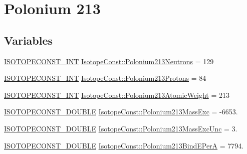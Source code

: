 \hypertarget{group___isotope_const-_polonium-_po213}{}\section{Polonium 213}
\label{group___isotope_const-_polonium-_po213}
\subsection*{Variables}
\begin{DoxyCompactItemize}
\item 
\mbox{\hyperlink{group___isotope_const-_macros_ga5f18360b3e99483a35c32d789e62621c}{I\+S\+O\+T\+O\+P\+E\+C\+O\+N\+S\+T\+\_\+\+I\+NT}} \mbox{\hyperlink{group___isotope_const-_polonium-_po213_gaacfed22d907ccd2d92b8512e03ebe974}{Isotope\+Const\+::\+Polonium213\+Neutrons}} = 129
\item 
\mbox{\hyperlink{group___isotope_const-_macros_ga5f18360b3e99483a35c32d789e62621c}{I\+S\+O\+T\+O\+P\+E\+C\+O\+N\+S\+T\+\_\+\+I\+NT}} \mbox{\hyperlink{group___isotope_const-_polonium-_po213_ga4028fa5f24ff516207ae584aaa287454}{Isotope\+Const\+::\+Polonium213\+Protons}} = 84
\item 
\mbox{\hyperlink{group___isotope_const-_macros_ga5f18360b3e99483a35c32d789e62621c}{I\+S\+O\+T\+O\+P\+E\+C\+O\+N\+S\+T\+\_\+\+I\+NT}} \mbox{\hyperlink{group___isotope_const-_polonium-_po213_ga7eec133bd2674a81f28f175942de5055}{Isotope\+Const\+::\+Polonium213\+Atomic\+Weight}} = 213
\item 
\mbox{\hyperlink{group___isotope_const-_macros_ga8f45a7272ce02c0b4c65c44636ed719a}{I\+S\+O\+T\+O\+P\+E\+C\+O\+N\+S\+T\+\_\+\+D\+O\+U\+B\+LE}} \mbox{\hyperlink{group___isotope_const-_polonium-_po213_gac4c8c9083640bd9eb436e688c36599cd}{Isotope\+Const\+::\+Polonium213\+Mass\+Exc}} = -\/6653.
\item 
\mbox{\hyperlink{group___isotope_const-_macros_ga8f45a7272ce02c0b4c65c44636ed719a}{I\+S\+O\+T\+O\+P\+E\+C\+O\+N\+S\+T\+\_\+\+D\+O\+U\+B\+LE}} \mbox{\hyperlink{group___isotope_const-_polonium-_po213_gae2a32661c2741668daa1f5a099826f45}{Isotope\+Const\+::\+Polonium213\+Mass\+Exc\+Unc}} = 3.
\item 
\mbox{\hyperlink{group___isotope_const-_macros_ga8f45a7272ce02c0b4c65c44636ed719a}{I\+S\+O\+T\+O\+P\+E\+C\+O\+N\+S\+T\+\_\+\+D\+O\+U\+B\+LE}} \mbox{\hyperlink{group___isotope_const-_polonium-_po213_gadd98d73e9dc2096d1752f89527fcded6}{Isotope\+Const\+::\+Polonium213\+Bind\+E\+PerA}} = 7794.
\item 

\end{DoxyCompactItemize}
